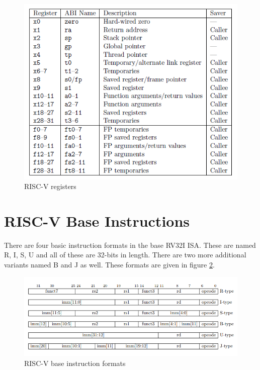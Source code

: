 \begin{figure}[h!]
    \centering
    \includegraphics{riscv/riscv_registers.png}
    \caption{RISC-V registers \cite{rvregisters}}
    \label{fig:riscv_registers}
\end{figure}

\section{RISC-V Base Instructions}
There are four basic instruction formats in the base RV32I ISA. These are named R, I, S, U and all of these are 32-bits in length. There are two more additional variants named B and J as well.\cite{rvmanual} These formats are given in figure \ref{fig:risc-v_base_instruction_formats}.
\begin{figure}
    \centering
    \includegraphics{riscv/riscv_base_instruction_formats.png}
    \caption{RISC-V base instruction formats \cite{rvmanual}}
    \label{fig:risc-v_base_instruction_formats}
\end{figure}

